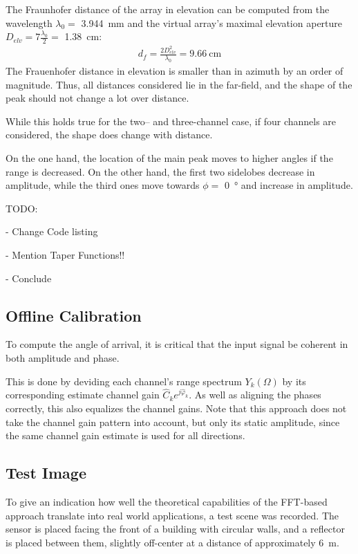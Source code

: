The Fraunhofer distance of the array in elevation can be computed from the wavelength $\lambda_0=$ \SIlist{3.944}{\mm}
and the virtual array's maximal elevation aperture $D_{elv} = 7 \frac{\lambda_0}{2}=$ \SI{1.38}{\cm}:
\begin{align}
    d_f  = \frac{2D_{elv}^2}{\lambda_0}
    = \SI{9.66}{\cm}
\end{align}
The Frauenhofer distance in elevation is smaller than in azimuth by an order of magnitude.
Thus, all distances considered lie in the far-field,
and the shape of the peak should not change a lot over distance.

While this holds true for the two-- and three-channel case, if four channels are considered,
the shape does change with distance.

On the one hand, the location of the main peak moves to higher angles if the range is decreased.
On the other hand, the first two sidelobes decrease in amplitude,
while the third ones move towards $\phi=$ \SI{0}{\degree} and increase in amplitude.

TODO:

- Change Code listing

- Mention Taper Functions!!

- Conclude

\subsection{Offline Calibration}
To compute the angle of arrival, it is critical that the input signal be coherent in both amplitude and phase.

This is done by deviding each channel's range spectrum $Y_k(\Omega)$ by its corresponding estimate channel gain $\hat C_k e^{j\hat \varphi_k}$.
As well as aligning the phases correctly, this also equalizes the channel gains.
Note that this approach does not take the channel gain pattern into account, but only its static amplitude, 
since the same channel gain estimate is used for all directions. \\


\subsection{Test Image}
\label{sec:fft_result}
To give an indication how well the theoretical capabilities of the FFT-based approach translate into real world applications,
a test scene was recorded. The sensor is placed facing the front of a building with circular walls, and
a reflector is placed between them, slightly off-center at a distance of approximately \SI{6}{\m}.

